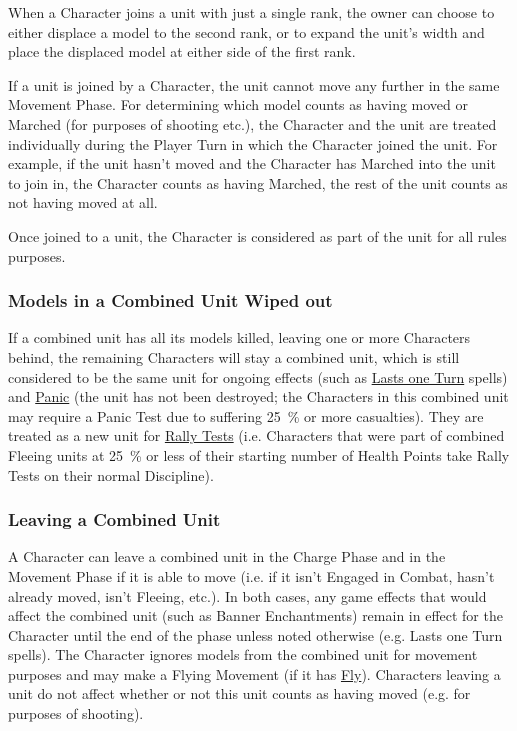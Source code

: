 When a Character joins a unit with just a single rank, the owner can choose to either displace a model to the second rank, or to expand the unit's width and place the displaced model at either side of the first rank.

If a unit is joined by a Character, the unit cannot move any further in the same Movement Phase. For determining which model counts as having moved or Marched (for purposes of shooting etc.), the Character and the unit are treated individually during the Player Turn in which the Character joined the unit. For example, if the unit hasn't moved and the Character has Marched into the unit to join in, the Character counts as having Marched, the rest of the unit counts as not having moved at all.

Once joined to a unit, the Character is considered as part of the unit for all rules purposes.

\subsubsection{\rnf{} Models in a Combined Unit Wiped out}

If a combined unit has all its \rnf{} models killed, leaving one or more Characters behind, the remaining Characters will stay a combined unit, which is still considered to be the same unit for ongoing effects (such as \hyperref[lasts_one_turn]{Lasts one Turn} spells) and \hyperref[panic_test]{Panic} (the unit has not been destroyed; the Characters in this combined unit may require a Panic Test due to suffering \SI{25}{\percent} or more casualties). They are treated as a new unit for \hyperref[rally_fleeing_units]{Rally Tests} (i.e. Characters that were part of combined Fleeing units at \SI{25}{\percent} or less of their starting number of Health Points take Rally Tests on their normal Discipline).

\subsubsection{Leaving a Combined Unit}

A Character can leave a combined unit in the Charge Phase and in the Movement Phase if it is able to move (i.e. if it isn't Engaged in Combat, hasn't already moved, isn't Fleeing, etc.). In both cases, any game effects that would affect the combined unit (such as Banner Enchantments) remain in effect for the Character until the end of the phase unless noted otherwise (e.g. Lasts one Turn spells). The Character ignores models from the combined unit for movement purposes and may make a Flying Movement (if it has \hyperref[fly]{Fly}). Characters leaving a unit do not affect whether or not this unit counts as having moved (e.g. for purposes of shooting).

